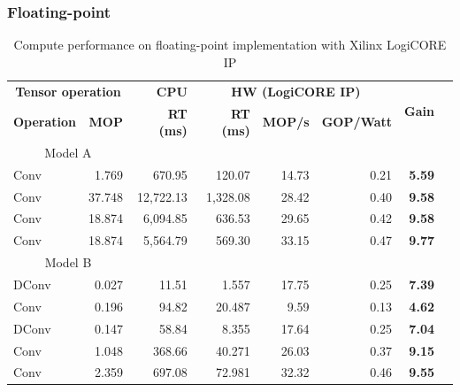 \subsubsection{Floating-point}
\begin{table}[!htp]\centering
	\caption{Compute performance on floating-point implementation with Xilinx LogiCORE IP}\label{tab:performace_float_logicore }
	\scriptsize
	\begin{tabular}{lrrrrrrr}\toprule
		\multicolumn{2}{c}{\textbf{Tensor operation}} &\textbf{CPU} &\multicolumn{3}{c}{\textbf{HW (LogiCORE IP)}} &\multirow{2}{*}{\textbf{Gain}} \\\cmidrule{1-6}
		\textbf{Operation} &\textbf{MOP} &\textbf{RT (ms)} &\textbf{RT (ms)} &\textbf{MOP/s} &\textbf{GOP/Watt} & \\\midrule
		\multicolumn{2}{c}{Model A} & & & & & \\
		Conv &1.769 &670.95 &120.07 &14.73 &0.21 &\textbf{5.59} \\
		Conv &37.748 &12,722.13 &1,328.08 &28.42 &0.40 &\textbf{9.58} \\
		Conv &18.874 &6,094.85 &636.53 &29.65 &0.42 &\textbf{9.58} \\
		Conv &18.874 &5,564.79 &569.30 &33.15 &0.47 &\textbf{9.77} \\
		\multicolumn{2}{c}{Model B} & & & & & \\
		DConv &0.027 &11.51 &1.557 &17.75 &0.25 &\textbf{7.39} \\
		Conv &0.196 &94.82 &20.487 &9.59 &0.13 &\textbf{4.62} \\
		DConv &0.147 &58.84 &8.355 &17.64 &0.25 &\textbf{7.04} \\
		Conv &1.048 &368.66 &40.271 &26.03 &0.37 &\textbf{9.15} \\
		Conv &2.359 &697.08 &72.981 &32.32 &0.46 &\textbf{9.55} \\
		\bottomrule
	\end{tabular}
\end{table}

